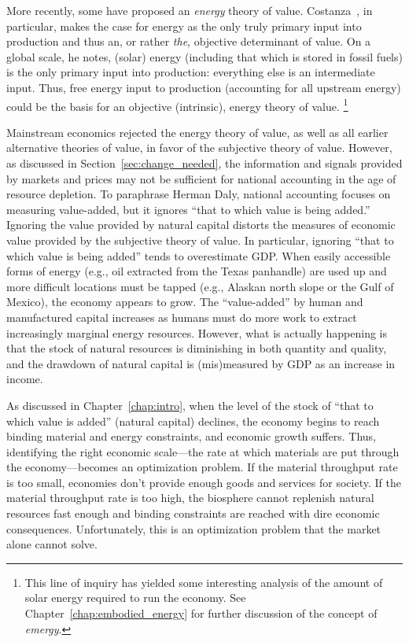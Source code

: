 More recently, some have proposed an \emph{energy} theory of value. 
Costanza~\cite{Costanza:2004we}, in particular, makes the case for energy 
as the only truly primary input into production 
and thus an, or rather \emph{the}, objective determinant of value. 
On a global scale, he notes, (solar) energy 
(including that which is stored in fossil fuels) is 
the only primary input into production:
everything else is an intermediate input. 
Thus, free energy input to production (accounting for all upstream energy)
could be the basis for an objective (intrinsic), 
energy theory of value.%
	\footnote{
	This line 
	of inquiry has yielded some interesting analysis of the amount 
	of solar energy required to run the economy. 
	See Chapter~\ref{chap:embodied_energy} for further discussion 
	of the concept of \emph{emergy}.
	}

Mainstream economics rejected the energy theory of value,
as well as all earlier alternative theories of value,
in favor of the subjective theory of value. 
However, as discussed in Section~\ref{sec:change_needed}, 
the information and signals provided by markets and prices 
may not be sufficient for national accounting in
the age of resource depletion. 
To paraphrase Herman Daly, 
national accounting focuses on measuring value-added, 
but it ignores ``that to which value is being added.'' \cite[p. 453]{Daly1995}
Ignoring the value provided by natural capital
distorts the measures of economic value provided by the subjective theory of value.
In particular, 
ignoring ``that to which value is being added'' 
tends to overestimate GDP. 
When easily accessible forms of energy 
(e.g., oil extracted from the Texas panhandle) 
are used up and more difficult locations must be tapped 
(e.g., Alaskan north slope or the Gulf of Mexico), 
the economy appears to grow.
The ``value-added'' by human and manufactured capital increases 
as humans must do more work to extract increasingly marginal 
energy resources. 
However, what is actually happening is that the stock 
of natural resources is diminishing in both quantity and quality, 
and the drawdown of natural capital is (mis)measured by GDP as 
an increase in income.\cite[pp.~66~and~75]{Daly1997}

As discussed in Chapter~\ref{chap:intro}, 
when the level of the stock of ``that to which value is added'' 
(natural capital) declines, 
the economy begins to reach binding material and energy constraints, 
and economic growth suffers. 
Thus, identifying the right economic 
scale---the rate at which materials are put through the 
economy---becomes an optimization problem. 
If the material throughput rate is too small, 
economies don't provide enough goods and services for society.
If the material throughput rate is too high, 
the biosphere cannot replenish natural resources fast enough and
binding constraints are reached with dire economic consequences.
Unfortunately, this is an optimization 
problem that the market alone cannot solve. 

